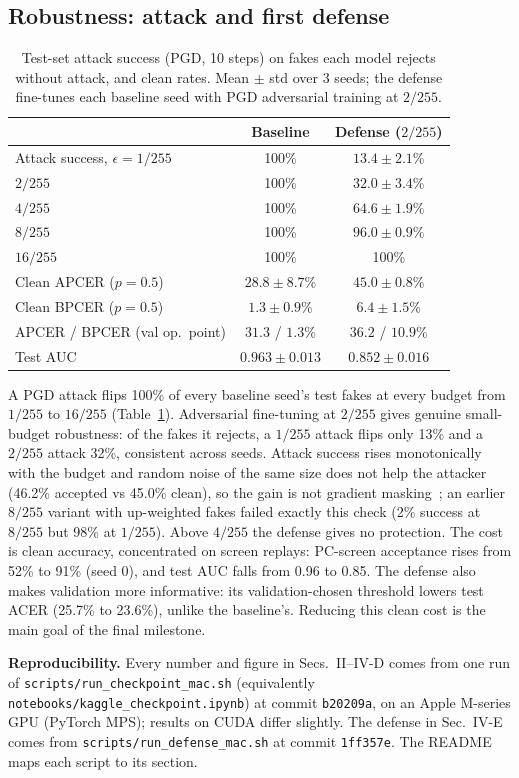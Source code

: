 \documentclass[conference]{IEEEtran}
\begin{document}
\subsection{Robustness: attack and first defense}
\begin{table}[t]\centering\small
\caption{Test-set attack success (PGD, 10 steps) on fakes each model rejects without attack, and clean rates.
Mean $\pm$ std over 3 seeds; the defense fine-tunes each baseline seed with PGD adversarial training at $2/255$.}
\label{tab:rob}
\begin{tabular}{lcc}\toprule
 & Baseline & Defense ($2/255$) \\\midrule
Attack success, $\epsilon=1/255$ & 100\% & $13.4\pm2.1$\% \\
\quad $2/255$ & 100\% & $32.0\pm3.4$\% \\
\quad $4/255$ & 100\% & $64.6\pm1.9$\% \\
\quad $8/255$ & 100\% & $96.0\pm0.9$\% \\
\quad $16/255$ & 100\% & 100\% \\\midrule
Clean APCER ($p{=}0.5$) & $28.8\pm8.7$\% & $45.0\pm0.8$\% \\
Clean BPCER ($p{=}0.5$) & $1.3\pm0.9$\% & $6.4\pm1.5$\% \\
APCER / BPCER (val op.\ point) & $31.3$ / $1.3$\% & $36.2$ / $10.9$\% \\
Test AUC & $0.963\pm0.013$ & $0.852\pm0.016$ \\\bottomrule
\end{tabular}
\end{table}
A PGD attack flips 100\% of every baseline seed's test fakes at every budget from $1/255$ to $16/255$
(Table~\ref{tab:rob}). Adversarial fine-tuning at $2/255$ gives genuine small-budget robustness: of the fakes it
rejects, a $1/255$ attack flips only 13\% and a $2/255$ attack 32\%, consistent across seeds. Attack success rises
monotonically with the budget and random noise of the same size does not help the attacker (46.2\% accepted vs
45.0\% clean), so the gain is not gradient masking~\cite{athalye2018obfuscated}; an earlier $8/255$ variant with
up-weighted fakes failed exactly this check (2\% success at $8/255$ but 98\% at $1/255$). Above $4/255$ the defense
gives no protection. The cost is clean accuracy, concentrated on screen replays: PC-screen acceptance rises from
52\% to 91\% (seed 0), and test AUC falls from 0.96 to 0.85. The defense also makes validation more informative:
its validation-chosen threshold lowers test ACER (25.7\% to 23.6\%), unlike the baseline's. Reducing this clean
cost is the main goal of the final milestone.

\textbf{Reproducibility.} Every number and figure in Secs.~II--IV-D comes from one run of
\texttt{scripts/\allowbreak run\_checkpoint\_\allowbreak mac.sh} (equivalently \texttt{notebooks/\allowbreak kaggle\_\allowbreak checkpoint.ipynb}) at commit
\texttt{b20209a}, on an Apple M-series GPU (PyTorch MPS); results on CUDA differ slightly. The defense in Sec.~IV-E comes from
\texttt{scripts/\allowbreak run\_defense\_\allowbreak mac.sh} at commit \texttt{1ff357e}. The README maps each script to its section.



\end{document}
